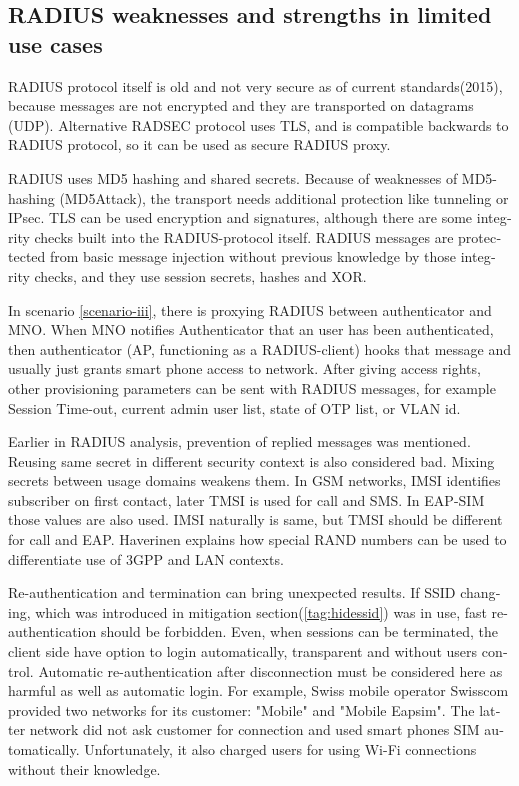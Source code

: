 \documentclass[12pt,a4paper,english]{tutthesis}
\begin{document}
\begin{otherlanguage}{english}
\section{RADIUS weaknesses and strengths in limited use cases}
\label{sec-6-7}


RADIUS protocol itself is old and not very secure as of current
standards(2015), because messages are not encrypted and they are
transported on datagrams (UDP). Alternative RADSEC protocol uses TLS, and 
is compatible backwards to RADIUS protocol, so it can be used
as secure RADIUS proxy\cite{uninett-radproxy}.

RADIUS uses MD5 hashing and shared secrets. Because of weaknesses of
MD5-hashing (MD5Attack\cite{rfc5176}), the transport needs additional protection like
tunneling or IPsec. TLS can be used encryption and
signatures, although there are some integrity checks built into the
RADIUS-protocol itself.
RADIUS messages are protectected from basic 
message injection without previous knowledge by those integrity checks,
and they use session secrets, hashes and XOR.


In scenario \ref{scenario-iii}, there is proxying RADIUS between authenticator
and MNO.  When MNO notifies Authenticator
that an user has been authenticated, then authenticator (AP, functioning
as a RADIUS-client) hooks that message and usually just grants smart
phone access to network. After giving access rights, other
provisioning parameters can be sent with RADIUS messages, for example
Session Time-out,
current admin user list, state of OTP list, or VLAN id.

Earlier in RADIUS analysis, prevention of replied messages was
mentioned. Reusing same secret in different security context is also
considered bad.  Mixing secrets between usage
domains weakens them.  In GSM networks, IMSI identifies subscriber on
first contact, later TMSI is used for call and SMS.  In EAP-SIM those
values are also used. IMSI naturally is same, but TMSI should be
different for call and EAP.  Haverinen\cite{hav-doc} explains how
special RAND numbers can be used to differentiate use of 3GPP and LAN
contexts.

Re-authentication and termination can bring unexpected results.
If SSID changing, which was introduced in mitigation section(\ref{tag:hidessid}) was in use, fast re-authentication
should be forbidden\cite[p.11]{rfc5448}.
Even, when sessions can be terminated, the client side have 
option to login automatically, transparent and without users control.
Automatic re-authentication after disconnection  must be considered
here as harmful as well as automatic login. For example,
Swiss mobile operator Swisscom provided two networks for its customer:
"Mobile" and "Mobile Eapsim". The latter network did not ask customer
for connection and used smart phones SIM automatically. Unfortunately,
it also charged users for using Wi-Fi connections without their 
knowledge.\cite{swisscom}






\end{otherlanguage}
\end{document}

